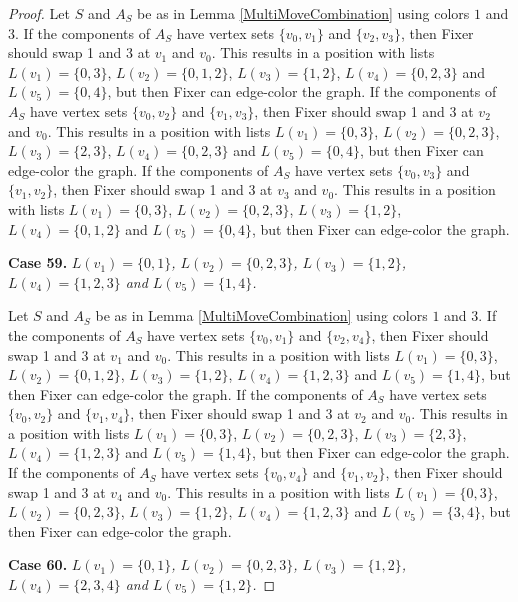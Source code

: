 \documentclass[12pt]{amsart}
\theoremstyle{plain}
\theoremstyle{definition}
\theoremstyle{remark}
\begin{document}
\begin{proof}
Let $S$ and $A_S$ be as in Lemma \ref{MultiMoveCombination} using colors $1$ and $3$. If the components of $A_S$ have vertex sets $\{v_0, v_1\}$ and $\{v_2, v_3\}$, then Fixer should swap 1 and 3 at $v_1$ and $v_0$. This results in a position with lists $L(v_1) = \{0, 3\}$, $L(v_2) = \{0, 1, 2\}$, $L(v_3) = \{1, 2\}$, $L(v_4) = \{0, 2, 3\}$ and $L(v_5) = \{0, 4\}$, but then Fixer can edge-color the graph.
If the components of $A_S$ have vertex sets $\{v_0, v_2\}$ and $\{v_1, v_3\}$, then Fixer should swap 1 and 3 at $v_2$ and $v_0$. This results in a position with lists $L(v_1) = \{0, 3\}$, $L(v_2) = \{0, 2, 3\}$, $L(v_3) = \{2, 3\}$, $L(v_4) = \{0, 2, 3\}$ and $L(v_5) = \{0, 4\}$, but then Fixer can edge-color the graph.
If the components of $A_S$ have vertex sets $\{v_0, v_3\}$ and $\{v_1, v_2\}$, then Fixer should swap 1 and 3 at $v_3$ and $v_0$. This results in a position with lists $L(v_1) = \{0, 3\}$, $L(v_2) = \{0, 2, 3\}$, $L(v_3) = \{1, 2\}$, $L(v_4) = \{0, 1, 2\}$ and $L(v_5) = \{0, 4\}$, but then Fixer can edge-color the graph.

\noindent\textbf{Case 59.  }\textit{$L(v_1) = \{0, 1\}$, $L(v_2) = \{0, 2, 3\}$, $L(v_3) = \{1, 2\}$, $L(v_4) = \{1, 2, 3\}$ and $L(v_5) = \{1, 4\}$.}

Let $S$ and $A_S$ be as in Lemma \ref{MultiMoveCombination} using colors $1$ and $3$. If the components of $A_S$ have vertex sets $\{v_0, v_1\}$ and $\{v_2, v_4\}$, then Fixer should swap 1 and 3 at $v_1$ and $v_0$. This results in a position with lists $L(v_1) = \{0, 3\}$, $L(v_2) = \{0, 1, 2\}$, $L(v_3) = \{1, 2\}$, $L(v_4) = \{1, 2, 3\}$ and $L(v_5) = \{1, 4\}$, but then Fixer can edge-color the graph.
If the components of $A_S$ have vertex sets $\{v_0, v_2\}$ and $\{v_1, v_4\}$, then Fixer should swap 1 and 3 at $v_2$ and $v_0$. This results in a position with lists $L(v_1) = \{0, 3\}$, $L(v_2) = \{0, 2, 3\}$, $L(v_3) = \{2, 3\}$, $L(v_4) = \{1, 2, 3\}$ and $L(v_5) = \{1, 4\}$, but then Fixer can edge-color the graph.
If the components of $A_S$ have vertex sets $\{v_0, v_4\}$ and $\{v_1, v_2\}$, then Fixer should swap 1 and 3 at $v_4$ and $v_0$. This results in a position with lists $L(v_1) = \{0, 3\}$, $L(v_2) = \{0, 2, 3\}$, $L(v_3) = \{1, 2\}$, $L(v_4) = \{1, 2, 3\}$ and $L(v_5) = \{3, 4\}$, but then Fixer can edge-color the graph.

\noindent\textbf{Case 60.  }\textit{$L(v_1) = \{0, 1\}$, $L(v_2) = \{0, 2, 3\}$, $L(v_3) = \{1, 2\}$, $L(v_4) = \{2, 3, 4\}$ and $L(v_5) = \{1, 2\}$.}


\end{proof}
\end{document}
